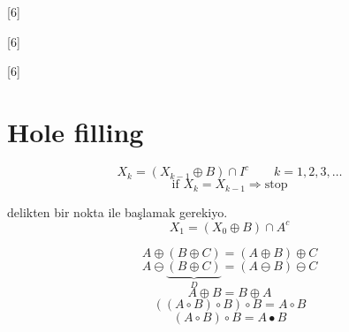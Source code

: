\documentclass[11pt,a4paper]{article}
\begin{document}
[6]

[6]

[6]

\section{Hole filling}
\[ X_k = (X_{k-1} \oplus B) \cap I^c \qquad k = 1,2,3,\dots \]
\[ \text{if } X_k = X_{k-1} \Rightarrow \text{stop} \]

delikten bir nokta ile başlamak gerekiyo.
\[ X_1 = (X_0 \oplus B) \cap A^c \]


\[ A \oplus (B \oplus C) = (A \oplus B) \oplus C \]
\[ A \ominus \underbrace{(B \oplus C)}_{D} = (A \ominus B) \ominus C \]
\[ A \oplus B = B \oplus A \]
\[ ((A \circ B) \circ B) \circ B = A \circ B \]
\[ (A \circ B) \circ B = A \bullet B \]
\end{document}
